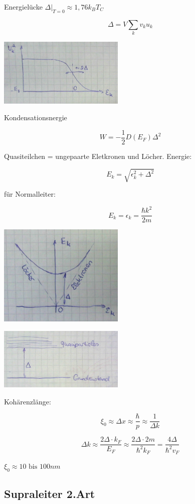 Energielücke \(\left.\Delta\right|_{T=0}\approx 1,76 k_BT_C\)

\[\Delta = V\sum_k v_ku_k\]

\includegraphics[width=0.45\textwidth]{kap13_15.png}


Kondensationsnergie 

\[W = -\frac{1}{2} D(E_F)\Delta^2\]

Quasiteilchen = ungepaarte Eletkronen und Löcher. Energie:

\[E_k = \sqrt{\epsilon^2_k+\Delta^2}\]

für Normalleiter: 

\[E_k = \epsilon_k = \frac{\hbar k^2}{2m}\]


\includegraphics[width=0.45\textwidth]{kap13_16.png}



\includegraphics[width=0.45\textwidth]{kap13_17.png}


Kohärenzlänge:

\[\xi_0 \approx \Delta x \approx \frac{\hbar}{p}\approx \frac{1}{\Delta k}\]

\[\Delta k \approx \frac{2\Delta\cdot k_F}{E_F}\approx \frac{2\Delta\cdot 2m}{\hbar^2 k_F} = \frac{4\Delta}{\hbar^2 v_F}\]

\(\xi_0\approx 10 \text{ bis } 100nm\)

\subsection{Supraleiter 2.Art}

